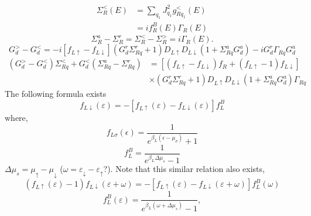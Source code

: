 \documentclass[11pt,a4paper]{article}
\begin{document}
\begin{equation}
\begin{split}
\Sigma_{R}^{<}(E) &=  \sum_{q_{1}}J_{q_{1}}^{2} g_{Rq_{1}}^{<}(E) \\
&= if_{R}^{B}(E) \Gamma_{R}(E)
\end{split}
\end{equation}
\begin{equation}
\Sigma_{R}^{a} - \Sigma_{R}^{r} = \Sigma_{R}^{<} - \Sigma_{R}^{>} = i\Gamma_{R}(E).
\end{equation}
\begin{equation}
G_{d}^{>}-G_{d}^{<}=-i\left[f_{L \uparrow}-f_{L \downarrow}\right]\left(G_{d}^{r} \Sigma_{R q}^{r}+1\right) D_{L \uparrow} D_{L \downarrow}\left(1+\Sigma_{R q}^{a} G_{d}^{a}\right)-i G_{d}^{r} \Gamma_{R q} G_{d}^{a}
\end{equation}
\begin{equation}
\begin{aligned}
\left(G_{d}^{>}-G_{d}^{<}\right) \Sigma_{R q}^{<}+G_{d}^{<}\left(\Sigma_{R q}^{a}-\Sigma_{R q}^{r}\right) &=\left[\left(f_{L \uparrow}-f_{L \downarrow}\right) f_{R}+\left(f_{L \uparrow}-1\right) f_{L \downarrow}\right] \\ & \times\left(G_{d}^{r} \Sigma_{R q}^{r}+1\right) D_{L \uparrow} D_{L \downarrow}\left(1+\Sigma_{R q}^{a} G_{d}^{a}\right) \Gamma_{R q} 
\end{aligned}
\label{eq:diff}
\end{equation}
The following formula exists
\begin{equation}
[f_{L \uparrow}(\varepsilon)-1] f_{L \downarrow}(\varepsilon) =-[f_{L \uparrow}(\varepsilon) -f_{L \downarrow}(\varepsilon)] f_{L}^{B}
\end{equation}
where,
\begin{equation}
f_{L \sigma}(\epsilon)=\frac{1}{e^{\beta_{L}(\epsilon-\mu_{\sigma})}+1}
\end{equation}
\begin{equation}
f_{L}^{B}= \frac{1}{e^{\beta_{L}\Delta \mu_{s}}-1 }
\end{equation}
$\Delta\mu_{s}=\mu_{\uparrow}-\mu_{\downarrow}$ ($\omega = \varepsilon_{\downarrow} - \varepsilon_{\uparrow}$?). Note that this similar relation also exists,
\begin{equation}
\left(f_{L \uparrow}(\varepsilon)-1\right) f_{L \downarrow}(\varepsilon+\omega)=-[f_{L \uparrow}(\varepsilon) - f_{L \downarrow}(\varepsilon+\omega)] f_{L}^{B}(\omega)
\end{equation}
\begin{equation}
f_{L}^{B}(\varepsilon) = \frac{1}{e^{\beta_{L}(\omega+\Delta \mu_{s})}-1 },
\end{equation}
\end{document}
